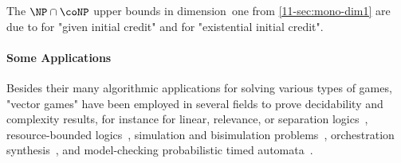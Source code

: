 The $\NP\cap\coNP$ upper bounds in dimension~one from
\cref{11-sec:mono-dim1} are due to  for "given
initial credit" and  for "existential initial credit".

\paragraph{Some Applications}
Besides their many algorithmic applications for solving various types
of games, "vector games" have been employed in several fields to prove
decidability and complexity results, for instance for linear,
relevance, or separation
logics~\cite{Lincoln&Mitchell&Scedrov&Shankar:1992,Kanovich:1995,Urquhart:1999,Larchey&Galmiche:2013,Brotherston&Kanovich:2014,Kanovich:2016},
resource-bounded logics~\cite{Alechina&al:2018}, simulation and
bisimulation
problems~\cite{Kiefer:2013,Abdulla&al:2013,Courtois&Schmitz:2014,Jancar&Osicka&Sawa:2018},
orchestration synthesis~\cite{DeGiacomo&Vardi&Felli&Alechina&Logan:2018},
and model-checking probabilistic timed
automata~\cite{Jurdzinski&Laroussinie&Sproston:2008}.


